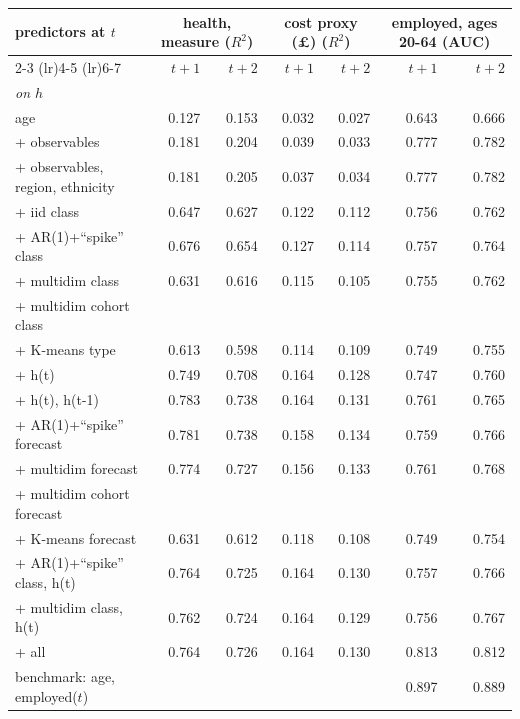 \begin{tabular}{lrrrrrr}
\toprule
predictors at $t$ & \multicolumn{2}{c}{health, measure ($R^2$)} & \multicolumn{2}{c}{cost proxy (\pounds) ($R^2$)} & \multicolumn{2}{c}{employed, ages 20-64 (AUC)} \\
\cmidrule(lr){2-3} \cmidrule(lr){4-5} \cmidrule(lr){6-7}
 & $t+1$ & $t+2$ & $t+1$ & $t+2$ & $t+1$ & $t+2$ \\
\midrule
\multicolumn{7}{l}{\emph{on $h$}} \\
age & 0.127 & 0.153 & 0.032 & 0.027 & 0.643 & 0.666 \\
+ observables & 0.181 & 0.204 & 0.039 & 0.033 & 0.777 & 0.782 \\
+ observables, region, ethnicity & 0.181 & 0.205 & 0.037 & 0.034 & 0.777 & 0.782 \\
+ iid class & 0.647 & 0.627 & 0.122 & 0.112 & 0.756 & 0.762 \\
+ AR(1)+``spike'' class & 0.676 & 0.654 & 0.127 & 0.114 & 0.757 & 0.764 \\
+ multidim class & 0.631 & 0.616 & 0.115 & 0.105 & 0.755 & 0.762 \\
+ multidim cohort class &  &  &  &  &  &  \\
+ K-means type & 0.613 & 0.598 & 0.114 & 0.109 & 0.749 & 0.755 \\
+ h(t) & 0.749 & 0.708 & 0.164 & 0.128 & 0.747 & 0.760 \\
+ h(t), h(t-1) & 0.783 & 0.738 & 0.164 & 0.131 & 0.761 & 0.765 \\
+ AR(1)+``spike'' forecast & 0.781 & 0.738 & 0.158 & 0.134 & 0.759 & 0.766 \\
+ multidim forecast & 0.774 & 0.727 & 0.156 & 0.133 & 0.761 & 0.768 \\
+ multidim cohort forecast &  &  &  &  &  &  \\
+ K-means forecast & 0.631 & 0.612 & 0.118 & 0.108 & 0.749 & 0.754 \\
+ AR(1)+``spike'' class, h(t) & 0.764 & 0.725 & 0.164 & 0.130 & 0.757 & 0.766 \\
+ multidim class, h(t) & 0.762 & 0.724 & 0.164 & 0.129 & 0.756 & 0.767 \\
+ all & 0.764 & 0.726 & 0.164 & 0.130 & 0.813 & 0.812 \\
\quad benchmark: age, employed($t$) &  &  &  &  & 0.897 & 0.889 \\
\bottomrule
\end{tabular}
